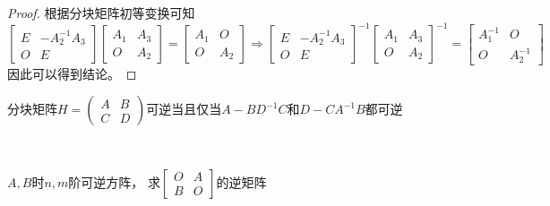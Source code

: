 \begin{proof}
  根据分块矩阵初等变换可知
  \begin{equation*}
    \left[
      \begin{array}{cc}
        E&-A_2^{-1}A_3\\
        O&E
      \end{array}
    \right]
    \left[
      \begin{array}{cc}
        A_1&A_3\\
        O&A_2
      \end{array}
    \right] = \left[
      \begin{array}{cc}
        A_1&O\\
        O&A_2
      \end{array}
    \right] \Rightarrow 
    \left[
      \begin{array}{cc}
        E&-A_2^{-1}A_3\\
        O&E
      \end{array}
    \right]^{-1}
    \left[
      \begin{array}{cc}
        A_1&A_3\\
        O&A_2
      \end{array}
    \right]^{-1} = \left[
      \begin{array}{cc}
        A_1^{-1}&O\\
        O&A_2^{-1}
      \end{array}
    \right]
  \end{equation*}
  因此可以得到结论。
\end{proof}

\begin{theorem}[一般分块矩阵可逆条件]
  分块矩阵$H = \left(
    \begin{array}{cc}
      A&B\\
      C&D
    \end{array}
  \right)$可逆当且仅当$A - BD^{-1}C$和$D - CA^{-1}B$都可逆
\end{theorem}

~

\begin{exercise}[分块矩阵求逆]
  $A,B$时$n,m$阶可逆方阵，
  求$\left[
    \begin{array}{cc}
      O&A\\
      B&O
    \end{array}
  \right]$的逆矩阵
\end{exercise}

